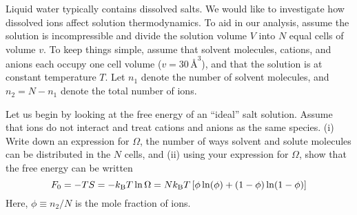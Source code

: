 \bigskip
{}
Liquid water typically contains dissolved salts.
We would like to investigate how dissolved ions
affect solution thermodynamics.
To aid in our analysis, assume the solution is incompressible
and divide the solution volume $V$ into
$N$ equal cells of volume $v$.
To keep things simple, assume that solvent molecules, cations, and anions 
each occupy one cell volume ($v = 30\,\text{\AA}^3$),
and that the solution is at constant temperature $T$. 
Let $n_1$ denote the number of solvent molecules,
and $n_2 = N - n_1$ denote the total number of ions.

\smallskip \subp
Let us begin by looking at the free energy of an ``ideal'' salt solution. 
Assume that ions do not interact and treat cations and anions as the same species.
(i) Write down an expression for $\Omega$,
the number of ways solvent and solute molecules 
can be distributed in the $N$ cells, and
(ii) using your expression for $\Omega$, 
show that the free energy can be written
\[
F_0 = -TS = - k_{\rm B} T \ln \Omega =
N k_{\rm B} T \left[ \phi \ln(\phi) + (1 - \phi) \ln(1 - \phi) \right]
\]
Here, $\phi \equiv n_2/N$ is the mole fraction of ions. 


